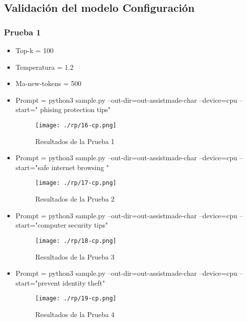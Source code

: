 \subsection{Validación del modelo Configuración}\label{section:Validación de prompt}
\subsubsection{ Prueba 1}\label{section:Validación del prototipo}
    \begin{itemize}
        \item   Top-k = 100
        \item   Temperatura = 1.2
        \item   Ma-new-tokens = 500
        \item    Prompt = python3 sample.py --out-dir=out-assistmade-char --device=cpu --start=" phising protection tips"
    
\begin{figure}[H]
   \centering %
       \texttt{[image: ./rp/16-cp.png]} 
   \caption{Resultados de la Prueba 1\cite{}}
  \label{figure:Prueba1}  %
\end{figure}
        \item   Prompt = python3 sample.py --out-dir=out-assistmade-char --device=cpu --start="safe internet browsing "
\begin{figure}[H]
   \centering %
       \texttt{[image: ./rp/17-cp.png]} 
   \caption{Resultados de la Prueba 2\cite{}}
  \label{figure:Prueba2}  %
\end{figure}
        \item   Prompt = python3 sample.py –out-dir=out-assistmade-char --device=cpu --start="computer security tips"
\begin{figure}[H]
   \centering %
       \texttt{[image: ./rp/18-cp.png]} 
   \caption{Resultados de la Prueba 3\cite{}}
  \label{figure:Resultado prueba 3}  %
\end{figure}
        \item   Prompt = python3 sample.py --out-dir=out-assistmade-char --device=cpu --start="prevent identity theft"
\begin{figure}[H]
   \centering %
       \texttt{[image: ./rp/19-cp.png]} 
   \caption{Resultados de la Prueba 4\cite{}}
  \label{figure:Resultado prueba 4}  %
\end{figure}
\end{itemize}
